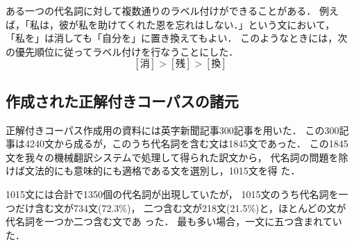 ある一つの代名詞に対して複数通りのラベル付けができることがある．
例えば，「私は，彼が私を助けてくれた恩を忘れはしない．」という文において，
「私を」は消しても「自分を」に置き換えてもよい．
このようなときには，次の優先順位に従ってラベル付けを行なうことにした．
\[ [消] > [残] > [換] \]

\subsection{作成された正解付きコーパスの諸元}
\label{sec:corpus:spec}

正解付きコーパス作成用の資料には英字新聞記事300記事を用いた．
この300記事は4240文から成るが，このうち代名詞を含む文は1845文であった．
この1845文を我々の機械翻訳システムで処理して得られた訳文から，
代名詞の問題を除けば文法的にも意味的にも適格である文を選別し，1015文を得
た．

1015文には合計で1350個の代名詞が出現していたが，
1015文のうち代名詞を一つだけ含む文が734文(72.3\%)，
二つ含む文が218文(21.5\%)と，ほとんどの文が代名詞を一つか二つ含む文であ
った．
最も多い場合，一文に五つ含まれていた．

